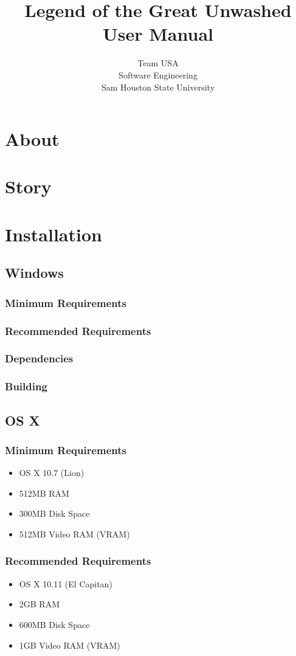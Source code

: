 \documentclass{article}
\title{Legend of the Great Unwashed \\ User Manual}
\author{Team USA \\ Software Engineering \\ Sam Houston State University}
\begin{document}
%
%
\maketitle
\newpage
%
%
\tableofcontents
\newpage
%
%
\section{About}
\section{Story}
\section{Installation}
	\subsection{Windows}
		\subsubsection{Minimum Requirements}
		\subsubsection{Recommended Requirements}
		\subsubsection{Dependencies}
		\subsubsection{Building}
	\subsection{OS X}
		\subsubsection{Minimum Requirements}
			\begin{itemize}
				\item OS X 10.7 (Lion)
				\item 512MB RAM
				\item 300MB Disk Space
				\item 512MB Video RAM (VRAM)
			\end{itemize}
		\subsubsection{Recommended Requirements}
			\begin{itemize}
				\item OS X 10.11 (El Capitan)
				\item 2GB RAM
				\item 600MB Disk Space
				\item 1GB Video RAM (VRAM)
			\end{itemize}
\end{document}
